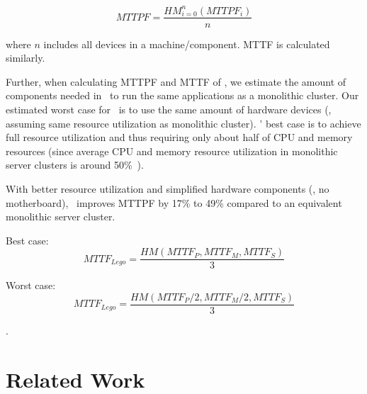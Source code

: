 \documentclass[10pt,times,twocolumn]{z2-article}
\begin{document}
{{{{{{{\begin{equation}
MTTPF = \frac{HM_{i=0}^n(MTTPF_i)}{n}
\end{equation}

where $n$ includes all devices in a machine/component. MTTF is calculated similarly.

Further, when calculating MTTPF and MTTF of \lego, we estimate the amount of components needed in \lego\ 
to run the same applications as a monolithic cluster.
Our estimated worst case for \lego\ is to use the same amount of hardware devices 
(\ie, assuming same resource utilization as monolithic cluster).
\lego{}' best case is to achieve full resource utilization 
and thus requiring only about half of CPU and memory resources 
(since average CPU and memory resource utilization in monolithic server clusters is around 50\%~\cite{GoogleTrace,AliTrace}).

With better resource utilization and simplified hardware components (\eg, no motherboard),
\lego\ improves MTTPF by 17\% to 49\% compared to an equivalent monolithic server cluster.

Best case:
\begin{equation}
MTTF_{Lego} = \frac{HM(MTTF_P, MTTF_M, MTTF_S)}{3}
\end{equation}

Worst case:
\begin{equation}
MTTF_{Lego} = \frac{HM(MTTF_P/2, MTTF_M/2, MTTF_S)}{3}
\end{equation}
\fi

.
\section{Related Work}
\label{sec:related}

}}}}}}}
\end{document}
